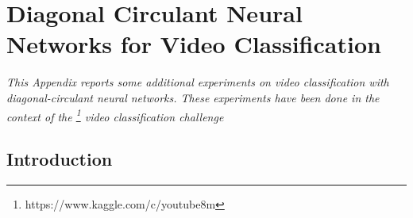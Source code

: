 \chapter{Diagonal Circulant Neural Networks for Video Classification}
\label{appendix:ap2-diagonal_circulant_neural_networks_for_video_classification}
\localtoc

\noindent
\emph{This Appendix reports some additional experiments on video classification with diagonal-circulant neural networks.
These experiments have been done in the context of the \yt\footnote{https://www.kaggle.com/c/youtube8m} video classification challenge}

\vspace{\fill}

\section{Introduction}
\label{section:ap2-introduction}

